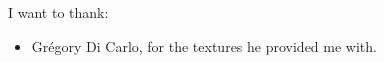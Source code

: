 I want to thank:
\begin{itemize}
\item Grégory Di Carlo, for the textures he provided me with.
\end{itemize}